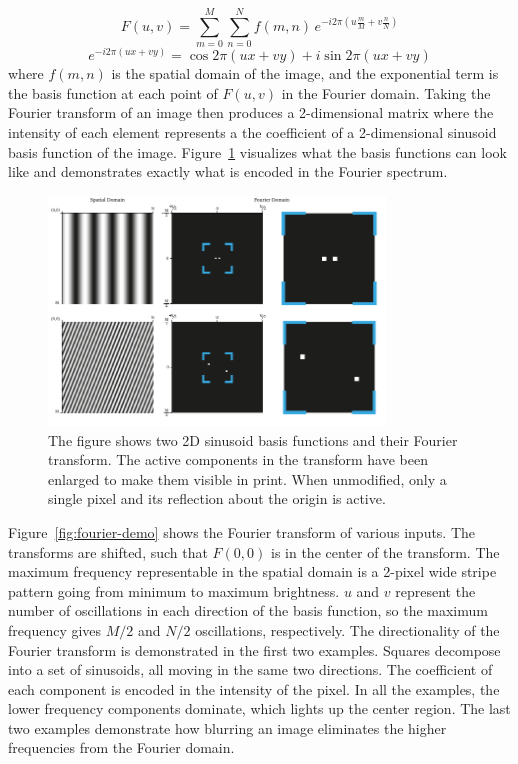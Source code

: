 \begin{equation}
  F(u,v) = \sum_{m=0}^{M}\sum_{n=0}^{N}f(m,n)\,e^{-i2\pi\left(u\frac{m}{M}+v\frac{n}{N}\right)}
\end{equation}%
\begin{equation*}
  e^{-i2\pi\left(ux+vy\right)} = \cos 2\pi\left(ux+vy\right) + i\sin 2\pi\left(ux+vy\right)
\end{equation*}
where \(f(m,n)\) is the spatial domain of the image, and the exponential term is the basis function at each point of \(F(u,v)\) in the Fourier domain.
Taking the Fourier transform of an image then produces a 2-dimensional matrix where the intensity of each element represents a the coefficient of a 2-dimensional sinusoid basis function of the image.
Figure~\ref{fig:fourier-sinusoid} visualizes what the basis functions can look like and demonstrates exactly what is encoded in the Fourier spectrum.

\begin{figure}[htbp]
  \centering
  \includegraphics[width=0.8\textwidth]{figs/method/fourier/fourier-sinusoid.pdf}
  \caption[Fourier transform of sinusoid]{The figure shows two 2D sinusoid basis functions and their Fourier transform.
The active components in the transform have been enlarged to make them visible in print.
When unmodified, only a single pixel and its reflection about the origin is active.}\label{fig:fourier-sinusoid}
\end{figure}

Figure~\ref{fig:fourier-demo} shows the Fourier transform of various inputs.
The transforms are shifted, such that \(F(0,0)\) is in the center of the transform.
The maximum frequency representable in the spatial domain is a 2-pixel wide stripe pattern going from minimum to maximum brightness.
\(u\) and \(v\) represent the number of oscillations in each direction of the basis function, so the maximum frequency gives \(M/ 2\) and \(N/ 2\) oscillations, respectively.
The directionality of the Fourier transform is demonstrated in the first two examples.
Squares decompose into a set of sinusoids, all moving in the same two directions.
The coefficient of each component is encoded in the intensity of the pixel.
In all the examples, the lower frequency components dominate, which lights up the center region.
The last two examples demonstrate how blurring an image eliminates the higher frequencies from the Fourier domain.

